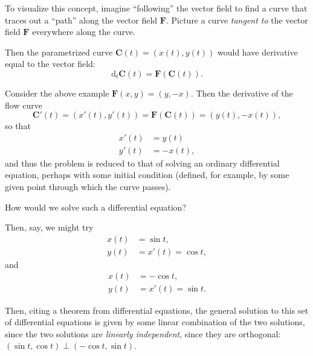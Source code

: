 \documentclass[11pt]{article}
\renewcommand{\vec}[1]{\bm{#1}}
\newcommand{\diff}{\mathrm d}
\begin{document}
To visualize this concept, imagine ``following'' the vector field to find a curve that traces out a ``path'' along the vector field \(\vec F\). Picture a curve \emph{tangent to} the vector field \(\vec F\) everywhere along the curve.

Then the parametrized curve \(\vec C(t) = (x(t), y(t))\) would have derivative equal to the vector field:
\[
    \diff_t \vec C (t) = \vec F(\vec C(t)).
\]

Consider the above example \(\vec F(x, y) = (y, -x)\). Then the derivative of the flow curve
\[
    \vec C'(t) = (x'(t), y'(t)) = \vec F (\vec C(t)) = (y(t), -x(t)),
\]
so that
\begin{align*}
    x'(t) &= y(t) \\
    y'(t) &= -x(t),
\end{align*}
and thus the problem is reduced to that of solving an ordinary differential equation, perhaps with some initial condition (defined, for example, by some given point through which the curve passes).

How would we solve such a differential equation?


Then, say, we might try
\begin{align*}
    x(t) &= \sin t, \\
    y(t) &= x'(t) = \cos t,
\end{align*}
and
\begin{align*}
    x(t) &= -\cos t, \\
    y(t) &= x'(t) = \sin t.
\end{align*}

Then, citing a theorem from differential equations, the general solution to this set of differential equations is given by some linear combination of the two solutions, since the two solutions are \emph{linearly independent}, since they are orthogonal: \((\sin t, \cos t) \perp (-\cos t, \sin t)\).
 
\end{document}
